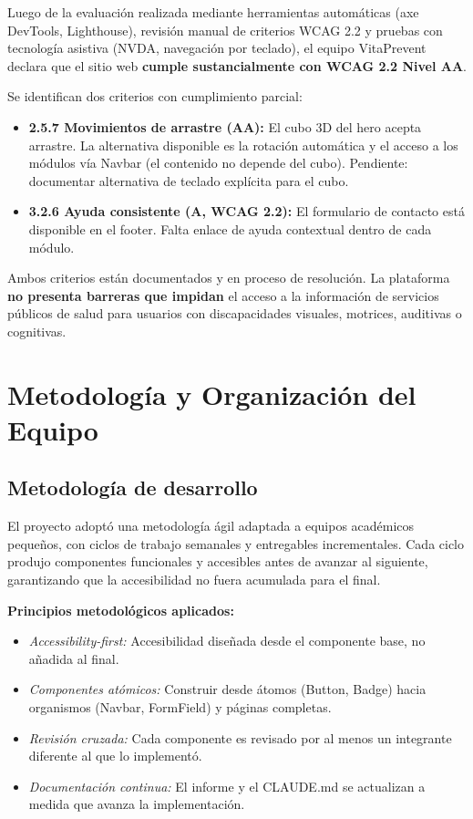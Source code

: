 \documentclass[12pt, a4paper]{report}
\begin{document}
\begin{wcagbox}
Luego de la evaluación realizada mediante herramientas automáticas (axe DevTools, Lighthouse), revisión manual de criterios WCAG 2.2 y pruebas con tecnología asistiva (NVDA, navegación por teclado), el equipo VitaPrevent declara que el sitio web \textbf{cumple sustancialmente con WCAG 2.2 Nivel AA}.

Se identifican dos criterios con cumplimiento parcial:
\begin{itemize}
  \item \textbf{2.5.7 Movimientos de arrastre (AA):} El cubo 3D del hero acepta arrastre. La alternativa disponible es la rotación automática y el acceso a los módulos vía Navbar (el contenido no depende del cubo). Pendiente: documentar alternativa de teclado explícita para el cubo.
  \item \textbf{3.2.6 Ayuda consistente (A, WCAG 2.2):} El formulario de contacto está disponible en el footer. Falta enlace de ayuda contextual dentro de cada módulo.
\end{itemize}

Ambos criterios están documentados y en proceso de resolución. La plataforma \textbf{no presenta barreras que impidan} el acceso a la información de servicios públicos de salud para usuarios con discapacidades visuales, motrices, auditivas o cognitivas.
\end{wcagbox}

\chapter{Metodología y Organización del Equipo}

\section{Metodología de desarrollo}

El proyecto adoptó una metodología ágil adaptada a equipos académicos pequeños, con ciclos de trabajo semanales y entregables incrementales. Cada ciclo produjo componentes funcionales y accesibles antes de avanzar al siguiente, garantizando que la accesibilidad no fuera acumulada para el final.

\textbf{Principios metodológicos aplicados:}
\begin{itemize}
  \item \textit{Accessibility-first:} Accesibilidad diseñada desde el componente base, no añadida al final.
  \item \textit{Componentes atómicos:} Construir desde átomos (Button, Badge) hacia organismos (Navbar, FormField) y páginas completas.
  \item \textit{Revisión cruzada:} Cada componente es revisado por al menos un integrante diferente al que lo implementó.
  \item \textit{Documentación continua:} El informe y el CLAUDE.md se actualizan a medida que avanza la implementación.
\end{itemize}
\end{document}
